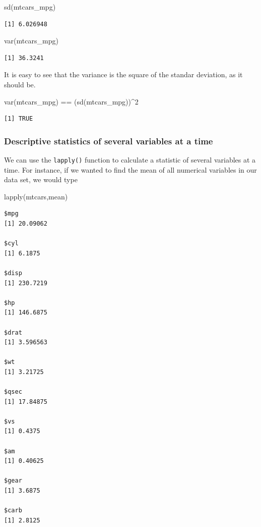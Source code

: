 \documentclass[
  letterpaper,
  DIV=11,
  numbers=noendperiod]{scrartcl}
\newenvironment{Shaded}{\begin{snugshade}}{\end{snugshade}}
\newcommand{\DecValTok}[1]{\textcolor[rgb]{0.68,0.00,0.00}{#1}}
\newcommand{\FunctionTok}[1]{\textcolor[rgb]{0.28,0.35,0.67}{#1}}
\newcommand{\NormalTok}[1]{\textcolor[rgb]{0.00,0.23,0.31}{#1}}
\newcommand{\SpecialCharTok}[1]{\textcolor[rgb]{0.37,0.37,0.37}{#1}}
\begin{document}
\begin{Shaded}
\begin{Highlighting}[]
\FunctionTok{sd}\NormalTok{(mtcars\_mpg)}
\end{Highlighting}
\end{Shaded}

\begin{verbatim}
[1] 6.026948
\end{verbatim}

\begin{Shaded}
\begin{Highlighting}[]
\FunctionTok{var}\NormalTok{(mtcars\_mpg)}
\end{Highlighting}
\end{Shaded}

\begin{verbatim}
[1] 36.3241
\end{verbatim}

It is easy to see that the variance is the square of the standar
deviation, as it should be.

\begin{Shaded}
\begin{Highlighting}[]
\FunctionTok{var}\NormalTok{(mtcars\_mpg) }\SpecialCharTok{==}\NormalTok{ (}\FunctionTok{sd}\NormalTok{(mtcars\_mpg))}\SpecialCharTok{\^{}}\DecValTok{2}
\end{Highlighting}
\end{Shaded}

\begin{verbatim}
[1] TRUE
\end{verbatim}

\subsubsection{Descriptive statistics of several variables at a
time}\label{descriptive-statistics-of-several-variables-at-a-time}

We can use the \texttt{lapply()} function to calculate a statistic of
several variables at a time. For instance, if we wanted to find the mean
of all numerical variables in our data set, we would type

\begin{Shaded}
\begin{Highlighting}[]
\FunctionTok{lapply}\NormalTok{(mtcars,mean)}
\end{Highlighting}
\end{Shaded}

\begin{verbatim}
$mpg
[1] 20.09062

$cyl
[1] 6.1875

$disp
[1] 230.7219

$hp
[1] 146.6875

$drat
[1] 3.596563

$wt
[1] 3.21725

$qsec
[1] 17.84875

$vs
[1] 0.4375

$am
[1] 0.40625

$gear
[1] 3.6875

$carb
[1] 2.8125
\end{verbatim}
\end{document}
